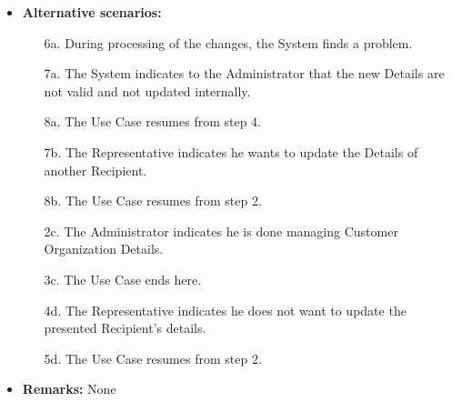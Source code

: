 \documentclass[a4paper,10pt]{article}
\begin{document}
\begin{itemize}
	\item \textbf{Alternative scenarios:} 
	\begin{enumerate}
		\item [6a.] During processing of the changes, the System finds a problem.
		\item [7a.] The System indicates to the Administrator that the new Details are not valid and not updated internally.
		\item [8a.] The Use Case resumes from step 4.
		\item [7b.] The Representative indicates he wants to update the Details of another Recipient.
		\item [8b.] The Use Case resumes from step 2.
		\item [2c.] The Administrator indicates he is done managing Customer Organization Details.
		\item [3c.] The Use Case ends here.
		\item [4d.] The Representative indicates he does not want to update the presented Recipient's details.
		\item [5d.] The Use Case resumes from step 2.
	\end{enumerate}
	
	\item \textbf{Remarks:}
	None
\end{itemize}
\end{document}
